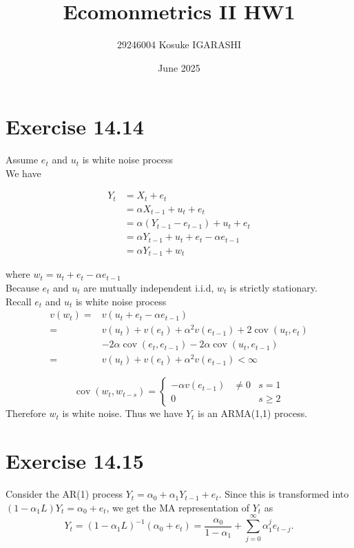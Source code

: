 \documentclass{article}
\title{Ecomonmetrics II HW1}
\author{29246004 Kosuke IGARASHI}
\date{June 2025}
\begin{document}
\maketitle

\section{Exercise 14.14}
Assume $e_t$ and $u_t$ is white noise process\\ 
We have
\begin{center}
           \begin{align*}
             Y_t&=X_t+e_t\\
             &=\alpha X_{t-1}+u_t+e_t\\
             &=\alpha (Y_{t-1}-e_{t-1})+u_t+e_t\\
             &=\alpha Y_{t-1}+u_t+e_t-\alpha e_{t-1}\\
             &=\alpha Y_{t-1}+w_t
            \end{align*}
           \end{center}

where $w_t=u_t+e_t-\alpha e_{t-1}$\\
Because $e_t$ and $u_t$ are mutually independent i.i.d, {$w_t$} is strictly stationary.\\
Recall $e_t$ and $u_t$ is white noise process\\ 
$$
\begin{aligned}
v\left(w_t\right)= & v\left(u_t+e_t-\alpha e_{t-1}\right) \\
= & v\left(u_t\right)+v\left(e_t\right)+\alpha^2 v\left(e_{t-1}\right)+2 \operatorname{cov}\left(u_t, e_t\right) \\
& -2 \alpha \operatorname{cov}\left(e_t, e_{t-1}\right)-2 \alpha \operatorname{cov}\left(u_t, e_{t-1}\right) \\
= & v\left(u_t\right)+v\left(e_t\right)+\alpha^2 v\left(e_{t-1}\right)<\infty
\end{aligned}
$$

$$
\operatorname{cov}\left(w_t, w_{t-s}\right)
=\left\{\begin{array}{ccc}
-\alpha v\left(e_{t-1}\right) & \neq 0 & s=1 \\
0 & & s \geq 2
\end{array}\right.
$$
Therefore  ${w_t}$  is white noise.
Thus we have $Y_t$ is an ARMA(1,1) process.

\section{Exercise 14.15}
    Consider the AR(1) process \(Y_t =\alpha_0 + \alpha_1 Y_{t-1} + e_t\).
    Since this is transformed into \((1-\alpha_1 L)Y_t=\alpha_0 + e_t\), we get the MA representation of \(Y_t\) as
    \[
    Y_t = (1-\alpha_1 L)^{-1}(\alpha_0+e_t)
         =\frac{\alpha_0}{1-\alpha_1} + \sum_{j=0}^\infty \alpha_1^j e_{t-j}.
    \]
    
\end{document}

